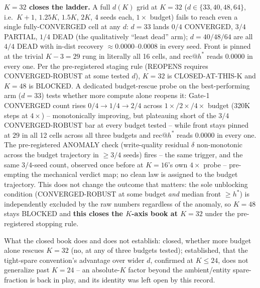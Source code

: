 \textbf{$K{=}32$ closes the ladder.} A full $d(K)$ grid at $K{=}32$
($d \in \{33, 40, 48, 64\}$, i.e.\ $K{+}1$, $1.25K$, $1.5K$, $2K$, 4 seeds
each, $1\times$ budget) fails to reach even a single fully-CONVERGED cell
at any $d$: $d{=}33$ lands $0/4$ CONVERGED, $3/4$ PARTIAL, $1/4$ DEAD (the
qualitatively ``least dead'' arm); $d{=}40/48/64$ are all $4/4$ DEAD with
in-dist recovery $\approx 0.0000$--$0.0008$ in every seed. Front is pinned
at the trivial $K{-}3{=}29$ rung in literally all 16 cells, and $\mathrm{rec@}h^\ast$
reads $0.0000$ in every one. Per the pre-registered staging rule (REOPENS
requires CONVERGED-ROBUST at some tested $d$), $K{=}32$ is
CLOSED-AT-THIS-K and $K{=}48$ is BLOCKED.
A dedicated budget-rescue probe on the best-performing arm ($d{=}33$)
tests whether more compute alone reopens it: Gate-1 CONVERGED count rises
$0/4 \to 1/4 \to 2/4$ across $1\times/2\times/4\times$ budget (320K steps
at $4\times$) -- monotonically improving, but plateauing short of the
$3/4$ CONVERGED-ROBUST bar at every budget tested -- while front stays
pinned at $29$ in all 12 cells across all three budgets and
$\mathrm{rec@}h^\ast$ reads $0.0000$ in every one.
The pre-registered ANOMALY check (write-quality residual $\delta$
non-monotonic across the budget trajectory in $\geq 3/4$ seeds) fires --
the same trigger, and the same $3/4$-seed count, observed once before at
$K{=}16$'s own $4\times$ probe -- pre-empting the mechanical verdict map;
no clean law is assigned to the budget trajectory. This does not change
the outcome that matters: the sole unblocking condition (CONVERGED-ROBUST
at some budget \emph{and} median front $\geq h^\ast$) is independently
excluded by the raw numbers regardless of the anomaly, so $K{=}48$ stays
BLOCKED and \textbf{this closes the $K$-axis book at $K{=}32$} under the
pre-registered stopping rule.

What the closed book does and does not establish: closed, whether more
budget alone rescues $K{=}32$ (no, at any of three budgets tested);
established, that the tight-spare convention's advantage over wider $d$,
confirmed at $K\leq 24$, does not generalize past $K{=}24$ -- an
absolute-$K$ factor beyond the ambient/entity spare-fraction is back in
play, and its identity was left open by this record.
